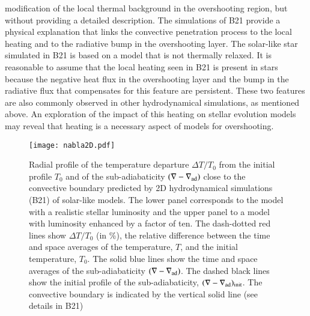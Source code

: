 \documentclass[traditabstract]{aa}
\newcommand{\3}{\ss}
\begin{document}
modification of the local thermal background in the overshooting region, but without providing a detailed description. 
The simulations of B21  provide a physical explanation that links the convective penetration process to the local heating and to the radiative bump in the overshooting layer. 
The solar-like star simulated in B21 is based on a model that is not thermally relaxed.  It is reasonable to assume  that the local heating seen in B21 is present in stars because the negative heat flux in the overshooting layer and the bump in the radiative flux that compensates for this feature are persistent.  These two features are also commonly observed in other hydrodynamical simulations, as mentioned above.  An exploration of the impact of this heating on stellar evolution models may reveal that heating is a necessary aspect of models for overshooting.

\begin{figure}[h!]
\texttt{[image: nabla2D.pdf]}
   \caption{Radial profile of the temperature departure $\Delta T/T_0$ from the initial profile $T_0$ and of the sub-adiabaticity $(\nabla - \nabla_{\rm ad})$ close to the convective boundary predicted by 2D hydrodynamical simulations (B21) of solar-like models. The  lower panel corresponds to the model with a realistic stellar luminosity and the upper panel to a model with luminosity enhanced by a factor of ten.  The dash-dotted red lines show $\Delta T/T_0$  (in \%), the relative difference between the time and space averages of the temperature, $T$, and the initial temperature, $T_0$. The solid blue lines show the time and space averages of 
   the sub-adiabaticity $(\nabla - \nabla_{\rm ad})$. The dashed black lines show the initial profile of the
   sub-adiabaticity, $(\nabla - \nabla_{\rm ad})_{\rm init}$. The convective boundary is indicated by the vertical solid line (see details in B21)}
 \label{nabla2D_fig}
\end{figure}
\end{document}
